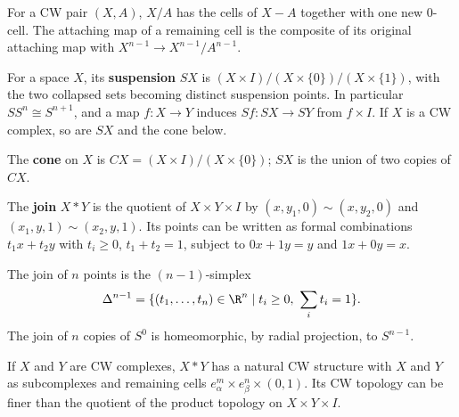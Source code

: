 \begin{definition}
\label{def:quotient-cw-structure}
\leanok
{}
For a CW pair $(X,A)$, $X/A$ has the cells of $X-A$ together with one new 0-cell.
The attaching map of a remaining cell is the composite of its original attaching map
with $X^{n-1}\to X^{n-1}/A^{n-1}$.
\end{definition}

\begin{definition}[Suspension]
\label{def:suspension}
\leanok
{}
For a space $X$, its \textbf{suspension} $SX$ is
$(X\times I)/(X\times\{0\})/(X\times\{1\})$, with the two collapsed sets becoming
distinct suspension points. In particular $SS^n\cong S^{n+1}$, and a map $f:X\to Y$
induces $Sf:SX\to SY$ from $f\times I$. If $X$ is a CW complex, so are $SX$ and
the cone below.
\end{definition}

\begin{definition}[Cone]
\label{def:cone}
\leanok
{}
The \textbf{cone} on $X$ is $CX=(X\times I)/(X\times\{0\})$; $SX$ is the union
of two copies of $CX$.
\end{definition}

\begin{definition}
\label{def:join}
\leanok
{}
The \textbf{join} $X*Y$ is the quotient of $X\times Y\times I$ by
$(x,y_1,0)\sim(x,y_2,0)$ and $(x_1,y,1)\sim(x_2,y,1)$. Its points can be written
as formal combinations $t_1x+t_2y$ with $t_i\ge0$, $t_1+t_2=1$, subject to
$0x+1y=y$ and $1x+0y=x$.
\end{definition}

\begin{definition}[Simplex]
\label{def:simplex}
\leanok
{}
The join of $n$ points is the $(n-1)$-simplex
\[
\Delta^{n-1}=\{(t_1,\ldots,t_n)\in\R^n\mid t_i\ge0,\ \sum_i t_i=1\}.
\]
The join of $n$ copies of $S^0$ is homeomorphic, by radial projection, to
$S^{n-1}$.
\end{definition}

If $X$ and $Y$ are CW complexes, $X*Y$ has a natural CW structure with $X$ and $Y$
as subcomplexes and remaining cells $e^m_\alpha\times e^n_\beta\times(0,1)$.
Its CW topology can be finer than the quotient of the product topology on
$X\times Y\times I$.

